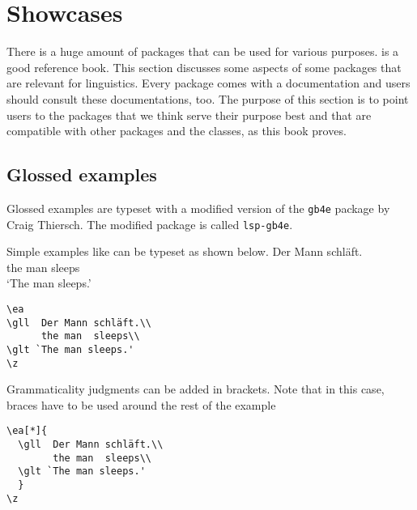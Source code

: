 \chapter{Showcases}

There is a huge amount of packages that can be used for various purposes. \citet{MG2013a} is a good
reference book. This section discusses some aspects of some packages that are relevant for
linguistics. Every \latex package comes with a documentation and users should consult these
documentations, too. The purpose of this section is to point users to the packages that we think
serve their purpose best and that are compatible with other packages and the \lsp classes, as this
book proves.

\section{Glossed examples}

Glossed examples are typeset with a modified version of the \texttt{gb4e} package by Craig
Thiersch. The modified package is called \texttt{lsp-gb4e}. 

Simple examples like  can be typeset as shown below.
\ea\label{ex:showcases:simple}
\gll Der Mann schläft.\\
     the man  sleeps\\
\glt `The man sleeps.'
\z
\begin{verbatim}
\ea
\gll  Der Mann schläft.\\
      the man  sleeps\\
\glt `The man sleeps.'
\z
\end{verbatim}

Grammaticality judgments can be added in brackets. Note that in this case, braces have to be used around the rest of the example
\z
\begin{verbatim}
\ea[*]{
  \gll  Der Mann schläft.\\
        the man  sleeps\\
  \glt `The man sleeps.'
  }
\z
\end{verbatim}

